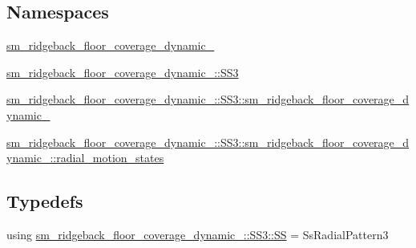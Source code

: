 \subsection*{Namespaces}
\begin{DoxyCompactItemize}
\item 
 \hyperlink{namespacesm__ridgeback__floor__coverage__dynamic__1}{sm\+\_\+ridgeback\+\_\+floor\+\_\+coverage\+\_\+dynamic\+\_}
\item 
 \hyperlink{namespacesm__ridgeback__floor__coverage__dynamic__1_1_1SS3}{sm\+\_\+ridgeback\+\_\+floor\+\_\+coverage\+\_\+dynamic\+\_\+::\+S\+S3}
\item 
 \hyperlink{namespacesm__ridgeback__floor__coverage__dynamic__1_1_1SS3_1_1sm__ridgeback__floor__coverage__dynamic__1}{sm\+\_\+ridgeback\+\_\+floor\+\_\+coverage\+\_\+dynamic\+\_\+::\+S\+S3\+::sm\+\_\+ridgeback\+\_\+floor\+\_\+coverage\+\_\+dynamic\+\_}
\item 
 \hyperlink{namespacesm__ridgeback__floor__coverage__dynamic__1_1_1SS3_1_1sm__ridgeback__floor__coverage__dy219296fef47c7df87f40c37807cf3514}{sm\+\_\+ridgeback\+\_\+floor\+\_\+coverage\+\_\+dynamic\+\_\+::\+S\+S3\+::sm\+\_\+ridgeback\+\_\+floor\+\_\+coverage\+\_\+dynamic\+\_\+::radial\+\_\+motion\+\_\+states}
\end{DoxyCompactItemize}
\subsection*{Typedefs}
\begin{DoxyCompactItemize}
\item 
using \hyperlink{namespacesm__ridgeback__floor__coverage__dynamic__1_1_1SS3_a365075198199db2a656a36cace4d7cc9}{sm\+\_\+ridgeback\+\_\+floor\+\_\+coverage\+\_\+dynamic\+\_\+::\+S\+S3\+::\+SS} = Ss\+Radial\+Pattern3
\end{DoxyCompactItemize}
